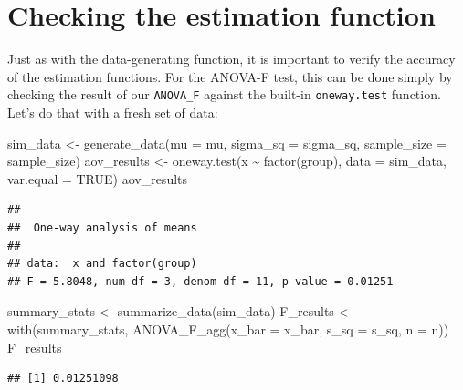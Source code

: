 \documentclass[
]{book}
\newenvironment{Shaded}{\begin{snugshade}}{\end{snugshade}}
\newcommand{\AttributeTok}[1]{\textcolor[rgb]{0.77,0.63,0.00}{#1}}
\newcommand{\ConstantTok}[1]{\textcolor[rgb]{0.00,0.00,0.00}{#1}}
\newcommand{\FunctionTok}[1]{\textcolor[rgb]{0.00,0.00,0.00}{#1}}
\newcommand{\NormalTok}[1]{#1}
\newcommand{\OtherTok}[1]{\textcolor[rgb]{0.56,0.35,0.01}{#1}}
\newcommand{\SpecialCharTok}[1]{\textcolor[rgb]{0.00,0.00,0.00}{#1}}
\begin{document}
\hypertarget{checking-the-estimation-function}{%
\section{Checking the estimation function}\label{checking-the-estimation-function}}

Just as with the data-generating function, it is important to verify the accuracy of the estimation functions. For the ANOVA-F test, this can be done simply by checking the result of our \texttt{ANOVA\_F} against the built-in \texttt{oneway.test} function. Let's do that with a fresh set of data:

\begin{Shaded}
\begin{Highlighting}[]
\NormalTok{sim\_data }\OtherTok{\textless{}{-}} \FunctionTok{generate\_data}\NormalTok{(}\AttributeTok{mu =}\NormalTok{ mu, }\AttributeTok{sigma\_sq =}\NormalTok{ sigma\_sq,}
                          \AttributeTok{sample\_size =}\NormalTok{ sample\_size)}
\NormalTok{aov\_results }\OtherTok{\textless{}{-}} \FunctionTok{oneway.test}\NormalTok{(x }\SpecialCharTok{\textasciitilde{}} \FunctionTok{factor}\NormalTok{(group), }\AttributeTok{data =}\NormalTok{ sim\_data, }
                           \AttributeTok{var.equal =} \ConstantTok{TRUE}\NormalTok{)}
\NormalTok{aov\_results}
\end{Highlighting}
\end{Shaded}

\begin{verbatim}
## 
##  One-way analysis of means
## 
## data:  x and factor(group)
## F = 5.8048, num df = 3, denom df = 11, p-value = 0.01251
\end{verbatim}

\begin{Shaded}
\begin{Highlighting}[]
\NormalTok{summary\_stats }\OtherTok{\textless{}{-}} \FunctionTok{summarize\_data}\NormalTok{(sim\_data)}
\NormalTok{F\_results }\OtherTok{\textless{}{-}} \FunctionTok{with}\NormalTok{(summary\_stats,}
                  \FunctionTok{ANOVA\_F\_agg}\NormalTok{(}\AttributeTok{x\_bar =}\NormalTok{ x\_bar, }\AttributeTok{s\_sq =}\NormalTok{ s\_sq, }\AttributeTok{n =}\NormalTok{ n))}
\NormalTok{F\_results}
\end{Highlighting}
\end{Shaded}

\begin{verbatim}
## [1] 0.01251098
\end{verbatim}
\end{document}
